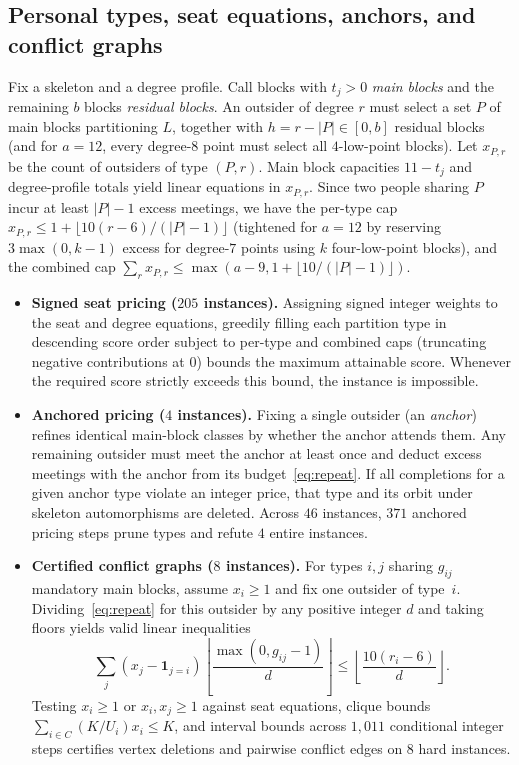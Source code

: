 \documentclass[11pt,a4paper]{article}
\theoremstyle{definition}
\theoremstyle{remark}
\begin{document}
\subsection{Personal types, seat equations, anchors, and conflict graphs}

Fix a skeleton and a degree profile. Call blocks with $t_j > 0$ \emph{main blocks} and the remaining $b$ blocks \emph{residual blocks}. An outsider of degree $r$ must select a set $P$ of main blocks partitioning $L$, together with $h = r - |P| \in [0, b]$ residual blocks (and for $a=12$, every degree-$8$ point must select all $4$-low-point blocks). Let $x_{P,r}$ be the count of outsiders of type $(P,r)$. Main block capacities $11 - t_j$ and degree-profile totals yield linear equations in $x_{P,r}$. Since two people sharing $P$ incur at least $|P| - 1$ excess meetings, we have the per-type cap $x_{P,r} \le 1 + \lfloor 10(r-6)/(|P|-1) \rfloor$ (tightened for $a=12$ by reserving $3\max(0,k-1)$ excess for degree-$7$ points using $k$ four-low-point blocks), and the combined cap $\sum_r x_{P,r} \le \max(a - 9, 1 + \lfloor 10/(|P|-1) \rfloor)$.

\begin{itemize}
  \item \textbf{Signed seat pricing ($205$ instances).} Assigning signed integer weights to the seat and degree equations, greedily filling each partition type in descending score order subject to per-type and combined caps (truncating negative contributions at $0$) bounds the maximum attainable score. Whenever the required score strictly exceeds this bound, the instance is impossible.
  \item \textbf{Anchored pricing ($4$ instances).} Fixing a single outsider (an \emph{anchor}) refines identical main-block classes by whether the anchor attends them. Any remaining outsider must meet the anchor at least once and deduct excess meetings with the anchor from its budget~\eqref{eq:repeat}. If all completions for a given anchor type violate an integer price, that type and its orbit under skeleton automorphisms are deleted. Across $46$ instances, $371$ anchored pricing steps prune types and refute $4$ entire instances.
  \item \textbf{Certified conflict graphs ($8$ instances).} For types $i, j$ sharing $g_{ij}$ mandatory main blocks, assume $x_i \ge 1$ and fix one outsider of type~$i$. Dividing~\eqref{eq:repeat} for this outsider by any positive integer $d$ and taking floors yields valid linear inequalities
  \[
    \sum_j (x_j - \mathbf{1}_{j=i})\left\lfloor \frac{\max(0, g_{ij} - 1)}{d} \right\rfloor \le \left\lfloor \frac{10(r_i - 6)}{d} \right\rfloor.
  \]
  Testing $x_i \ge 1$ or $x_i, x_j \ge 1$ against seat equations, clique bounds $\sum_{i \in C} (K/U_i)x_i \le K$, and interval bounds across $1{,}011$ conditional integer steps certifies vertex deletions and pairwise conflict edges on $8$ hard instances.
\end{itemize}
\end{document}
